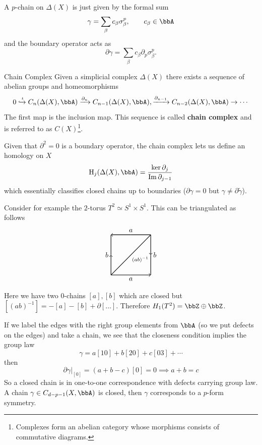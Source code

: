 \documentclass[11pt]{article}
\theoremstyle{definition}
\numberwithin{equation}{section}
\newcommand\HH{\mathrm{H}}
\begin{document}
A $p$-chain on $\Delta(X)$ is just given by the formal sum
\begin{equation}
	 \gamma=\sum_{\beta}c_{\beta}\sigma^{p}_{\beta},\qquad c_{\beta}\in\bbA
\end{equation}
and the boundary operator acts as
\begin{equation}
	\partial \gamma=\sum_{\beta}c_{\beta}\partial_{p}\sigma_{\beta}^{p}.
\end{equation}
\begin{defn}{Chain Complex}{}
	Given a simplicial complex $\Delta(X)$ there exists a sequence of abelian groups and homeomorphisms
	\begin{equation}
		0\xhookrightarrow{\iota} C_{n}(\Delta(X),\bbA)\xrightarrow{\partial_{n}} C_{n-1}(\Delta(X),\bbA),\xrightarrow{\partial_{n-1}}C_{n-2}(\Delta(X),\bbA)\rightarrow\cdots
	\end{equation}
	The first map is the inclusion map. This sequence is called \textbf{chain complex} and is referred to as $C(X)$\footnote{Complexes form an abelian category whose morphisms consists of commutative diagrams.}.
\end{defn}
Given that $\partial^{2}=0$ is a boundary operator, the chain complex lets us define an homology on $X$
\begin{equation}
	\HH_{j}(\Delta(X),\bbA)=\frac{\ker \partial_{j}}{\Im \partial_{j-1}}
\end{equation}
which essentially classifies closed chains up to boundaries ($\partial\gamma=0$ but $\gamma\neq\partial\tilde\gamma$).

Consider for example the $2$-torus $T^{2}\simeq S^{1}\times S^{1}$. This can be triangulated as follows
\begin{equation}
\begin{tikzpicture}[thick]
  \draw[->](0,0)--(0,1) node[anchor=east] {$b$};
  \draw[-](0,1)--(0,2);
  \draw[<-](0,2)--(1,2) node[anchor=south] {$a$};
  \draw[-](1,2)--(2,2);
  \draw[->](2,2)--(2,1)node[anchor=west] {$b$};
  \draw[-](2,1)--(2,0);
  \draw[<-](2,0)--(1,0) node[anchor=north] {$a$};
  \draw[-](1,0)--(0,0);
  \draw[-](0,0)--(2,2) node[yshift=-35, xshift=-15] {$\scriptstyle{(ab)^{-1}}$};
\end{tikzpicture}
\end{equation}
Here we have two $0$-chains $[a],[b]$ which are closed but $[(ab)^{-1}]=-[a]-[b]+\partial[\ldots]$. Therefore $H_{1}(T^{2})=\bbZ\oplus\bbZ$.

If we label the edges with the right group elements from $\bbA$ (so we put defects on the edges) and take a chain, we see that the closeness condition implies the group law
\begin{equation}
	\gamma=a[10]+b[20]+c[03]+\cdots
\end{equation}
then
\begin{equation}
	\left.\partial\gamma\right|_{[0]}=(a+b-c)[0]=0\implies a+b=c
\end{equation}
So a closed chain is in one-to-one correspondence with defects carrying group law. A chain $\gamma\in C_{d-p-1}(X,\bbA)$ is closed, then $\gamma$ corresponds to a $p$-form symmetry.
\end{document}
